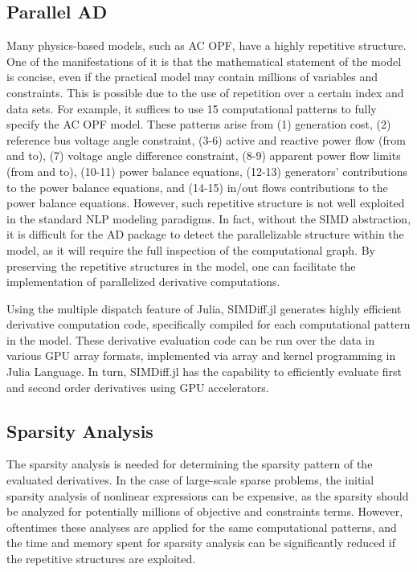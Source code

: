 \subsection{Parallel AD}
\label{sec:simd:ad}
Many physics-based models, such as AC OPF, have a highly repetitive
structure. One of the manifestations of it is that the mathematical
statement of the model is concise, even if the practical model may contain
millions of variables and constraints. This is possible due to the use of
repetition over a certain index and data sets. For example,
it suffices to use 15 computational patterns to fully specify the
AC OPF model. These patterns arise from (1) generation cost, (2) reference
bus voltage angle constraint, (3-6) active and reactive power flow (from and to),
(7) voltage angle difference constraint, (8-9) apparent
power flow limits (from and to), (10-11) power balance equations,
(12-13) generators' contributions to the power balance equations, and
(14-15) in/out flows contributions to the power balance
equations. However, such repetitive structure is not well exploited
in the standard NLP modeling paradigms. In
fact, without the SIMD abstraction, it is difficult for the AD package
to detect the parallelizable structure within the model, as it will
require the full inspection of the computational graph. By preserving
the repetitive structures in the model, one can facilitate the
implementation of parallelized derivative computations.

Using the multiple dispatch feature of Julia, SIMDiff.jl generates
highly efficient derivative computation code, specifically compiled
for each computational pattern in the model. These derivative
evaluation code can be run over the data in various GPU array formats,
implemented via array and kernel programming in Julia Language. In
turn, SIMDiff.jl has the capability to efficiently evaluate first and
second order derivatives using GPU accelerators.

\subsection{Sparsity Analysis}
The sparsity analysis is needed for determining the sparsity pattern
of the evaluated derivatives. In the case of large-scale sparse
problems, the initial sparsity analysis of nonlinear expressions can
be expensive, as the sparsity should be analyzed for potentially
millions of objective and constraints terms. However, oftentimes
these analyses are applied for the same computational patterns, and
the time and memory spent for sparsity analysis can be significantly
reduced if the repetitive structures are exploited.

